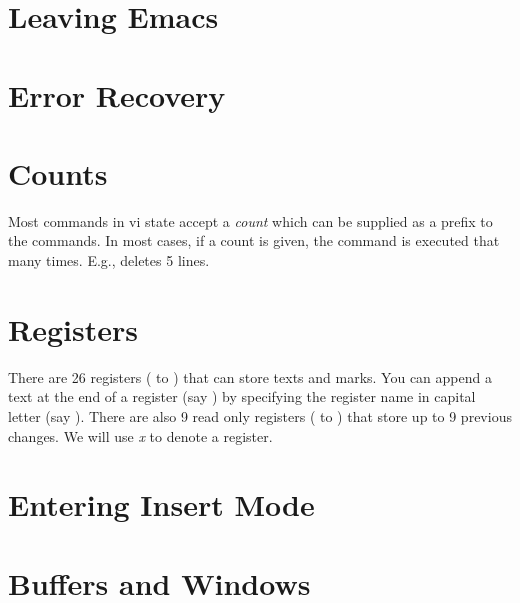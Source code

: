 \section{Leaving Emacs}


\shortcopyrightnotice

\section{Error Recovery}



\section{Counts}

Most commands in vi state accept a {\it count} which can be supplied as a
prefix to the commands.  In most cases, if a count is given, the
command is executed that many times.  E.g.,  deletes 5
lines.

\section{Registers}

There are 26 registers ( to ) that can store texts
and marks.
You can append a text at the end of a register (say ) by
specifying the register name in capital letter (say ).
There are also 9 read only registers ( to ) that store
up to 9 previous changes.
We will use {\it x\/} to denote a register.
\section{Entering Insert Mode}


\section{Buffers and Windows}

